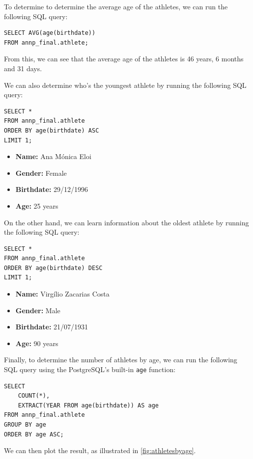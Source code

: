 \documentclass[a4paper, 11pt]{article}
\begin{document}
To determine to determine the average age of the athletes, we can run the following SQL query:

\begin{verbatim}
SELECT AVG(age(birthdate))
FROM annp_final.athlete;
\end{verbatim}

From this, we can see that the average age of the athletes is 46 years, 6 months and 31 days.

We can also determine who's the youngest athlete by running the following SQL query:

\begin{verbatim}
SELECT *
FROM annp_final.athlete
ORDER BY age(birthdate) ASC
LIMIT 1;
\end{verbatim}

\begin{itemize}
    \item \textbf{Name:} Ana Mónica Eloi
    \item \textbf{Gender:} Female
    \item \textbf{Birthdate:} 29/12/1996
    \item \textbf{Age:} 25 years
\end{itemize}

On the other hand, we can learn information about the oldest athlete by running the following SQL query:

\begin{verbatim}
SELECT *
FROM annp_final.athlete
ORDER BY age(birthdate) DESC
LIMIT 1;
\end{verbatim}

\begin{itemize}
    \item \textbf{Name:} Virgílio Zacarias Costa
    \item \textbf{Gender:} Male
    \item \textbf{Birthdate:} 21/07/1931
    \item \textbf{Age:} 90 years
\end{itemize}

Finally, to determine the number of athletes by age, we can run the following SQL query using the PostgreSQL's built-in
\texttt{age} function:

\begin{verbatim}
SELECT
    COUNT(*),
    EXTRACT(YEAR FROM age(birthdate)) AS age
FROM annp_final.athlete
GROUP BY age
ORDER BY age ASC;
\end{verbatim}

We can then plot the result, as illustrated in \cref{fig:athletesbyage}.
\end{document}

